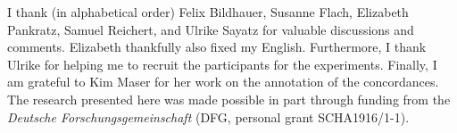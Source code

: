 \documentclass[USenglish]{article}
\begin{document}



\begin{acknowledgement}
  I thank (in alphabetical order) Felix Bildhauer, Susanne Flach, Elizabeth Pankratz, Samuel Reichert, and Ulrike Sayatz for valuable discussions and comments.
  Elizabeth thankfully also fixed my English.
  Furthermore, I thank Ulrike for helping me to recruit the participants for the experiments.
  Finally, I am grateful to Kim Maser for her work on the annotation of the concordances.
  The research presented here was made possible in part through funding from the \textit{Deutsche Forschungsgemeinschaft} (DFG, personal grant SCHA1916/1-1).
\end{acknowledgement}






\end{document}
